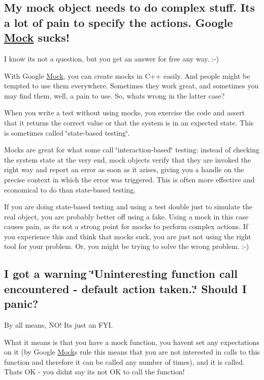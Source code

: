\subsection*{My mock object needs to do complex stuff. It\textquotesingle{}s a lot of pain to specify the actions. Google \mbox{\hyperlink{classMock}{Mock}} sucks!}

I know it\textquotesingle{}s not a question, but you get an answer for free any way. \+:-\/)

With Google \mbox{\hyperlink{classMock}{Mock}}, you can create mocks in C++ easily. And people might be tempted to use them everywhere. Sometimes they work great, and sometimes you may find them, well, a pain to use. So, what\textquotesingle{}s wrong in the latter case?

When you write a test without using mocks, you exercise the code and assert that it returns the correct value or that the system is in an expected state. This is sometimes called \char`\"{}state-\/based testing\char`\"{}.

Mocks are great for what some call \char`\"{}interaction-\/based\char`\"{} testing\+: instead of checking the system state at the very end, mock objects verify that they are invoked the right way and report an error as soon as it arises, giving you a handle on the precise context in which the error was triggered. This is often more effective and economical to do than state-\/based testing.

If you are doing state-\/based testing and using a test double just to simulate the real object, you are probably better off using a fake. Using a mock in this case causes pain, as it\textquotesingle{}s not a strong point for mocks to perform complex actions. If you experience this and think that mocks suck, you are just not using the right tool for your problem. Or, you might be trying to solve the wrong problem. \+:-\/)

\subsection*{I got a warning \char`\"{}\+Uninteresting function call encountered -\/ default action taken..\char`\"{} Should I panic?}

By all means, N\+O! It\textquotesingle{}s just an F\+YI.

What it means is that you have a mock function, you haven\textquotesingle{}t set any expectations on it (by Google \mbox{\hyperlink{classMock}{Mock}}\textquotesingle{}s rule this means that you are not interested in calls to this function and therefore it can be called any number of times), and it is called. That\textquotesingle{}s OK -\/ you didn\textquotesingle{}t say it\textquotesingle{}s not OK to call the function!

